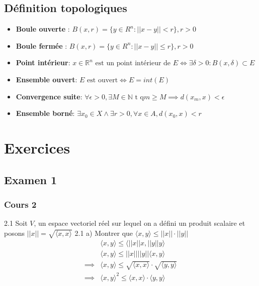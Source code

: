 \documentclass[12pt]{book}
\let\Bbb\mathbb
\theoremstyle{definition}
\begin{document}
\section{Définition topologiques}
\begin{itemize}
    \item \textbf{Boule ouverte} : $B(x, r) = \{y \in R^n : || x - y || < r\}, r > 0$
    \item \textbf{Boule fermée} : $B(x, r) = \{y \in R^n : || x - y || \leq r\}, r > 0$
    \item \textbf{Point intérieur}: $x \in \Bbb R^n \text{ est un point intérieur de } E \iff \exists \delta > 0 : B(x, \delta) \subset E$
    \item \textbf{Ensemble ouvert}: $E\text{ est ouvert} \iff E = int(E)$
    \item \textbf{Convergence suite}: $\forall \epsilon > 0, \exists M \in \Bbb N \text{ t q} m \geq M \implies d(x_m, x) < \epsilon$
    \item \textbf{Ensemble borné}: $\exists x_0 \in X \land \exists r > 0, \forall x \in A, d(x_0, x) < r$
\end{itemize}

\chapter{Exercices}
\section{Examen 1}
\subsection{Cours 2}
2.1 Soit $V$, un espace vectoriel réel sur lequel on a défini un produit scalaire et posons $||x|| = \sqrt{\langle x, x \rangle}$
2.1 a) Montrer que $\langle x, y \rangle \leq ||x|| \cdot ||y||$
\begin{align*}
    & \langle x, y \rangle \leq \langle ||x||x, ||y||y \rangle  \\
    & \langle x, y \rangle \leq ||x||||y||\langle x, y \rangle \\
    \implies & \langle x, y \rangle \leq \sqrt{\langle x, x \rangle} \cdot \sqrt{\langle y, y \rangle} \\
    \implies & \langle x, y \rangle^2 \leq \langle x, x \rangle \cdot \langle y, y \rangle \\
\end{align*}
\end{document}
